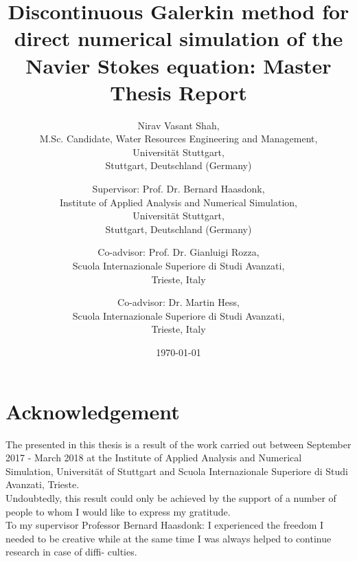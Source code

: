 \documentclass[a4paper]{book}
\begin{document}
\begin{center}

\title{Discontinuous Galerkin method for direct numerical simulation of the Navier Stokes equation: Master Thesis Report}


\author{Nirav Vasant Shah, \\M.Sc. Candidate, Water Resources Engineering and Management, \\Universit\"at Stuttgart, \\Stuttgart, Deutschland (Germany)\\ 
\and Supervisor: Prof. Dr. Bernard Haasdonk,\\ Institute of Applied Analysis and Numerical Simulation, \\Universit\"at Stuttgart,\\ Stuttgart, Deutschland (Germany)\\ \and Co-advisor: Prof. Dr. Gianluigi Rozza,\\ Scuola Internazionale Superiore di Studi Avanzati, \\Trieste, Italy \\ \and Co-advisor: Dr. Martin Hess,\\ Scuola Internazionale Superiore di Studi Avanzati, \\Trieste, Italy }
\date{\today}
\maketitle

\end{center}

\noindent

\section{Acknowledgement}

The  presented in this thesis is a result of the work carried out between September 2017 - March 2018 at the Institute of Applied Analysis and Numerical Simulation, Universit\"at of Stuttgart and Scuola Internazionale Superiore di Studi Avanzati, Trieste. \\

Undoubtedly, this result could only be achieved by the support of a number of people to whom I would
like to express my gratitude.\\

To my supervisor Professor Bernard Haasdonk: I experienced the freedom I needed to be
creative while at the same time I was always helped to continue research in case of diffi-
culties. \\
\end{document}
